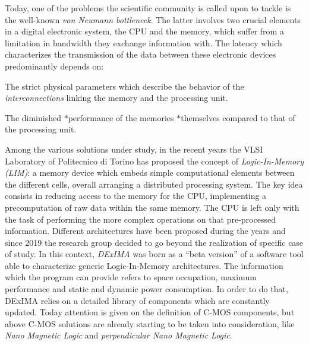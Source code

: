 Today, one of the problems the scientific community is called upon to tackle is the well-\/known {\itshape von Neumann bottleneck}. The latter involves two crucial elements in a digital electronic system, the C\+PU and the memory, which suffer from a limitation in bandwidth they exchange information with. The latency which characterizes the transmission of the data between these electronic devices predominantly depends on\+:
\begin{DoxyItemize}
\item The strict physical parameters which describe the behavior of the {\itshape interconnections} linking the memory and the processing unit.
\item The diminished $\ast$performance of the memories $\ast$themselves compared to that of the processing unit.
\end{DoxyItemize}

Among the various solutions under study, in the recent years the V\+L\+SI Laboratory of Politecnico di Torino has proposed the concept of {\itshape Logic-\/\+In-\/\+Memory (L\+IM)}\+: a memory device which embeds simple computational elements between the different cells, overall arranging a distributed processing system. The key idea consists in reducing access to the memory for the C\+PU, implementing a precomputation of raw data within the same memory. The C\+PU is left only with the task of performing the more complex operations on that pre-\/processed information. Different architectures have been proposed during the years and since 2019 the research group decided to go beyond the realization of specific case of study. In this context, {\itshape D\+Ex\+I\+MA} was born as a “beta version” of a software tool able to characterize generic Logic-\/\+In-\/\+Memory architectures. The information which the program can provide refers to space occupation, maximum performance and static and dynamic power consumption. In order to do that, D\+Ex\+I\+MA relies on a detailed library of components which are constantly updated. Today attention is given on the definition of C-\/\+M\+OS components, but above C-\/\+M\+OS solutions are already starting to be taken into consideration, like {\itshape Nano Magnetic Logic} and {\itshape perpendicular Nano Magnetic Logic}.


